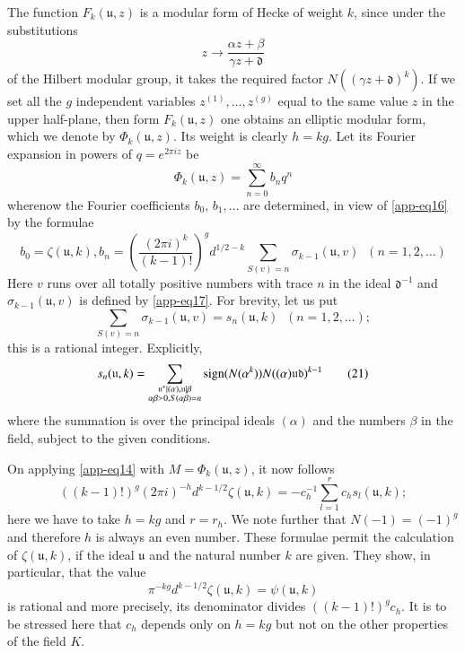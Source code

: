 The function $F_{k}(\mathfrak{u},z)$ is a modular form of Hecke of
weight $k$, since under the substitutions
$$
z\to \frac{\alpha z+\beta}{\gamma z+\mathfrak{d}}
$$
of the Hilbert modular group, it takes the required factor $N((\gamma
z+\mathfrak{d})^{k})$. If we set all the $g$ independent variables
$z^{(1)},\ldots,z^{(g)}$ equal to the same value $z$ in the upper
half-plane, then form $F_{k}(\mathfrak{u},z)$ one obtains an elliptic
modular form, which we denote by $\Phi_{k}(\mathfrak{u},z)$. Its
weight is clearly $h=kg$. Let its Fourier expansion in powers of
$q=e^{2\pi iz}$ be 
$$
\Phi_{k}(\mathfrak{u},z)=\sum^{\infty}_{n=0}b_{n}q^{n}
$$
where\pageoriginale now the Fourier coefficients $b_{0}$,
$b_{1},\ldots$ are determined, in view of \eqref{app-eq16} by the
formulae
\begin{equation*}
b_{0}=\zeta(\mathfrak{u},k), b_{n}=\left(\frac{(2\pi
  i)^{k}}{(k-1)!}\right)^{g}d^{1/2-k}\sum_{S(v)=n}\sigma_{k-1}(\mathfrak{u},v)
\;\; (n=1,2,\ldots)\tag{19}\label{app-eq19} 
\end{equation*}
Here $v$ runs over all totally positive numbers with trace $n$ in the
ideal $\mathfrak{d}^{-1}$ and $\sigma_{k-1}(\mathfrak{u},v)$ is defined by
\eqref{app-eq17}. For brevity, let us put
\begin{equation*}
\sum_{S(v)=n}\sigma_{k-1}(\mathfrak{u},v)=s_{n}(\mathfrak{u},k) \;\;
(n=1,2,\ldots);\tag{20}\label{app-eq20}  
\end{equation*}
this is a rational integer. Explicitly,
\begin{equation*}
s_{n}(\mathfrak{u},k)=\sum_{\substack{\mathfrak{u}^{\ast}|(\alpha),\mathfrak{u}|\beta\\ \alpha\beta
    \succ 0,S(\alpha\beta)=n}}\operatorname{sign}
(N(\alpha^{k}))N((\alpha)\mathfrak{u}\mathfrak{d})^{k-1}\tag{21}\label{app-eq21} 
\end{equation*}
where the summation is over the principal ideals $(\alpha)$ and the
numbers $\beta$ in the field, subject to the given conditions.

On applying \eqref{app-eq14} with $M=\Phi_{k}(\mathfrak{u},z)$, it now
follows
\begin{equation*}
((k-1)!)^{g}(2\pi
  i)^{-h}d^{k-1/2} \zeta(\mathfrak{u},k) = -c^{-1}_{h} \sum^{r}_{l=1}
  c_{h} s_{l}(\mathfrak{u},k);\tag{22}\label{app-eq22}  
\end{equation*}
here we have to take $h=kg$ and $r=r_{h}$. We note further that
$N(-1)=(-1)^{g}$ and therefore $h$ is always an even number. These
formulae permit the calculation of $\zeta(\mathfrak{u},k)$, if the
ideal $\mathfrak{u}$ and the natural number $k$ are given. They show,
in particular, that the value
$$
\pi^{-kg}d^{k-1/2}\zeta(\mathfrak{u},k)=\psi(\mathfrak{u},k)
$$
is rational and more precisely, its denominator divides
$((k-1)!)^{g}c_{h}$. It is to be stressed here that $c_{h}$ depends
only on $h=kg$ but not on the other properties of the field $K$.

